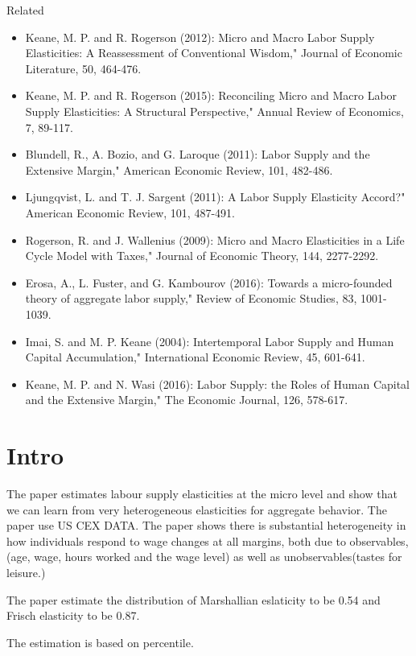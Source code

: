 \cite{Attanasio2015AggregatingSupply}
Related
\begin{itemize}
    \item  Keane, M. P. and R. Rogerson (2012): Micro and Macro Labor Supply Elasticities: A Reassessment of Conventional Wisdom," Journal of Economic Literature, 50, 464-476.
    \item Keane, M. P. and R. Rogerson (2015): Reconciling Micro and Macro Labor Supply Elasticities: A Structural Perspective," Annual Review of Economics, 7, 89-117.
    \item Blundell, R., A. Bozio, and G. Laroque (2011): Labor Supply and the Extensive Margin," American Economic Review, 101, 482-486.
    \item Ljungqvist, L. and T. J. Sargent (2011): A Labor Supply Elasticity Accord?" American Economic Review, 101, 487-491.
    \item Rogerson, R. and J. Wallenius (2009): Micro and Macro Elasticities in a Life Cycle Model with Taxes," Journal of Economic Theory, 144, 2277-2292.
    \item Erosa, A., L. Fuster, and G. Kambourov (2016): Towards a micro-founded theory of aggregate labor supply," Review of Economic Studies, 83, 1001-1039.
    \item Imai, S. and M. P. Keane (2004): Intertemporal Labor Supply and Human Capital Accumulation," International Economic Review, 45, 601-641.
    \item Keane, M. P. and N. Wasi (2016): Labor Supply: the Roles of Human Capital and the Extensive Margin," The Economic Journal, 126, 578-617.
\end{itemize}
\section{Intro}
The paper estimates labour supply elasticities at the micro level and show that we can learn from very heterogeneous elasticities for aggregate behavior.
The paper use US CEX DATA.
The paper shows there is substantial heterogeneity in how individuals respond to wage changes at all margins, both due to observables,(age, wage, hours worked and the wage level) as well as unobservables(tastes for leisure.)

The paper estimate the distribution of Marshallian eslaticity to be 0.54 and Frisch elasticity to be 0.87.

The estimation is based on percentile.


